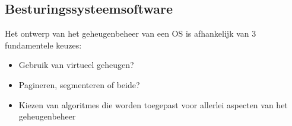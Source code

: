 \subsection{Besturingssysteemsoftware}

Het ontwerp van het geheugenbeheer van een OS is afhankelijk van 3 fundamentele keuzes:

\begin{itemize}
\item Gebruik van virtueel geheugen?
\item Pagineren, segmenteren of beide?
\item Kiezen van algoritmes die worden toegepast voor allerlei aspecten van het geheugenbeheer
\end{itemize}

\begingroup
\setlength{\tabcolsep}{10pt} %
\renewcommand{\arraystretch}{1.5} %
